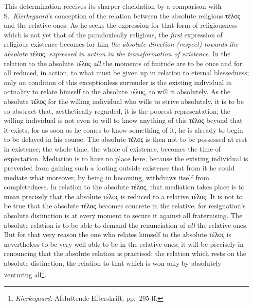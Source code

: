 \documentclass[12pt,a4paper]{book}
\begin{document}
This determination receives its sharper elucidation by a comparison with S.\
\emph{Kierkegaard}'s conception of the relation between the absolute religious
τέλος and the relative ones. As he seeks the expression for that form of
religiousness which is not yet that of the paradoxically religious, the
\emph{first} expression of religious existence becomes for him \emph{the
absolute direction (respect) towards the absolute} τέλος, \emph{expressed in
action in the transformation of existence}. In the relation to the absolute
τέλος \emph{all} the moments of finitude are to be once and for all reduced,
in action, to what must be given up in relation to eternal blessedness; only
on condition of this exceptionless surrender is the existing individual in
actuality to relate himself to the absolute τέλος, to will it absolutely. As
the absolute τέλος for the willing individual who wills to strive absolutely,
it is to be so abstract that, aesthetically regarded, it is the poorest
representation; the willing individual is not even to will to know anything of
this τέλος beyond that it exists; for
\setcounter{footnote}{0}%
as soon as he comes to know something of it, he is already to begin to be
delayed in his course. The absolute τέλος is then not to be possessed at rest
in existence; the whole time, the whole of existence, becomes the time of
expectation. Mediation is to have no place here, because the existing
individual is prevented from gaining such a footing outside existence that
from it he could mediate what moreover, by being in becoming, withdraws itself
from completedness. In relation to the absolute τέλος, that mediation takes
place is to mean precisely that the absolute τέλος is reduced to a relative
τέλος. It is not to be true that the absolute τέλος becomes concrete in the
relative; for resignation's absolute distinction is at every moment to secure
it against all fraternising. The absolute relation is to be able to demand the
renunciation of \emph{all} the relative ones. But for that very reason the one
who relates himself to the absolute τέλος is nevertheless to be very well able
to be in the relative ones; it will be precisely in renouncing that the
absolute relation is practised: the relation which rests on the absolute
distinction, the relation to that which is won only by absolutely venturing
all\footnote{\emph{Kierkegaard}: Afsluttende Efterskrift, pp.\ 295 ff.}.
\end{document}

